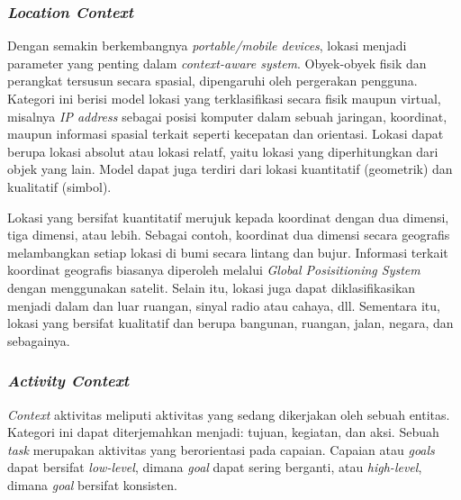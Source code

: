 \subsubsection{\textit{Location Context}}
\label{sssec:location-context}
Dengan semakin berkembangnya \textit{portable/mobile devices}, lokasi menjadi parameter yang penting dalam \textit{context-aware system}. Obyek-obyek fisik dan perangkat tersusun secara spasial, dipengaruhi oleh pergerakan pengguna. Kategori ini berisi model lokasi yang terklasifikasi secara fisik maupun virtual, misalnya \textit{IP address} sebagai posisi komputer dalam sebuah jaringan, koordinat, maupun informasi spasial terkait seperti kecepatan dan orientasi. Lokasi dapat berupa lokasi absolut atau lokasi relatf, yaitu lokasi yang diperhitungkan dari objek yang lain. Model dapat juga terdiri dari lokasi kuantitatif (geometrik) dan kualitatif (simbol).


Lokasi yang bersifat kuantitatif merujuk kepada koordinat dengan dua dimensi, tiga dimensi, atau lebih. Sebagai contoh, koordinat dua dimensi secara geografis melambangkan setiap lokasi di bumi secara lintang dan bujur. Informasi terkait koordinat geografis biasanya diperoleh melalui \textit{Global Posisitioning System} dengan menggunakan satelit. Selain itu, lokasi juga dapat diklasifikasikan menjadi dalam dan luar ruangan, sinyal radio atau cahaya, dll. Sementara itu, lokasi yang bersifat kualitatif dan berupa bangunan, ruangan, jalan, negara, dan sebagainya. 


\subsubsection{\textit{Activity Context}}
\label{sssec:activity-context}
\textit{Context} aktivitas meliputi aktivitas yang sedang dikerjakan oleh sebuah entitas. Kategori ini dapat diterjemahkan menjadi: tujuan, kegiatan, dan aksi. Sebuah \textit{task} merupakan aktivitas yang berorientasi pada capaian. Capaian atau \textit{goals} dapat bersifat \textit{low-level}, dimana \textit{goal} dapat sering berganti, atau \textit{high-level}, dimana \textit{goal} bersifat konsisten.


